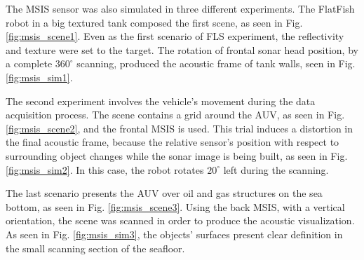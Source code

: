 \documentclass[final,5p,times]{elsarticle}
\begin{document}
The MSIS sensor was also simulated in three different experiments. The FlatFish robot in a big textured tank composed the first scene, as seen in Fig. \ref{fig:msis_scene1}. Even as the first scenario of FLS experiment, the reflectivity and texture were set to the target. The rotation of frontal sonar head position, by a complete $360^{\circ}$ scanning, produced the acoustic frame of tank walls, seen in Fig. \ref{fig:msis_sim1}.

The second experiment involves the vehicle's movement during the data acquisition process. The scene contains a grid around the AUV, as seen in Fig. \ref{fig:msis_scene2}, and the frontal MSIS is used. This trial induces a distortion in the final acoustic frame, because the relative sensor's position with respect to surrounding object changes while the sonar image is being built, as seen in Fig. \ref{fig:msis_sim2}. In this case, the robot rotates $20^{\circ}$ left during the scanning.

The last scenario presents the AUV over oil and gas structures on the sea bottom, as seen in Fig. \ref{fig:msis_scene3}. Using the back MSIS, with a vertical orientation, the scene was scanned in order to produce the acoustic visualization. As seen in Fig. \ref{fig:msis_sim3}, the objects' surfaces present clear definition in the small scanning section of the seafloor.
\end{document}

